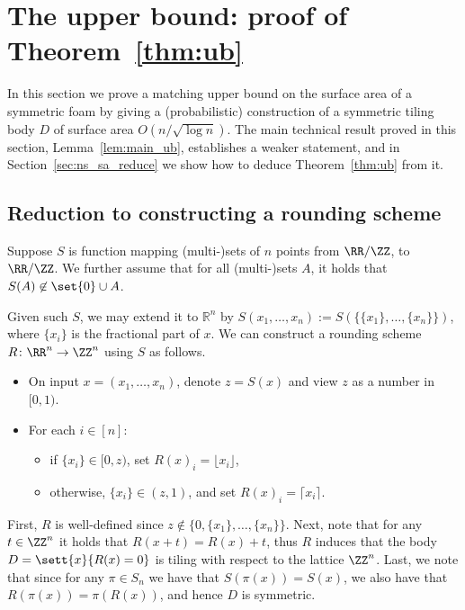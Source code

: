 \setcounter{thm}{21}\setcounter{section}{3}\section{The upper bound: proof of Theorem~\ref{thm:ub}}\label{sec:ub}
In this section we prove a matching upper bound on the surface area of a symmetric foam by giving a
(probabilistic) construction of a symmetric tiling body $D$ of surface area $O(n/\sqrt{\log n})$.
The main technical result proved in this section, Lemma~\ref{lem:main_ub}, establishes a weaker statement,
and in Section~\ref{sec:ns_sa_reduce} we show how to deduce Theorem~\ref{thm:ub} from it.

\subsection{Reduction to constructing a rounding scheme}\label{sec:mapping_to_tiling}
Suppose $S$ is function mapping (multi-)sets of $n$ points from $\RR/\ZZ$, to $\RR/\ZZ$.
We further assume that for all (multi-)sets $A$, it holds that $S(A)\not\in\set{0}\cup A$.


Given such $S$, we may extend it to $\mathbb{R}^n$ by
$S(x_1,\ldots,x_n):=S(\{\{x_1\},\ldots,\{x_n\}\})$, where $\{x_i\}$ is the fractional part of $x$.
We can construct a rounding scheme
$R\colon \RR^n\to \ZZ^n$ using $S$ as follows.
\begin{itemize}
	\item
	On input $x=(x_1,\ldots,x_n)$, denote $z=S(x)$ and view
	$z$ as a number in $[0,1)$.
	\item For each $i\in [n]$:
\begin{itemize}
    \item
	if $\{x_i\}\in [0,z)$, set $R(x)_i = \lfloor x_i \rfloor$,
    \item otherwise, $\{x_i\}\in (z,1)$, and set $R(x)_i = \lceil x_i \rceil$.
\end{itemize}
\end{itemize}
First, $R$ is well-defined since $z\notin \{0,\{x_1\},\ldots,\{x_n\}\}$.
Next, note that for any $t\in\ZZ^n$ it holds that $R(x+t)=R(x)+t$, thus $R$ induces
that the body $D = \sett{x}{R(x) = 0}$ is tiling with respect to the lattice $\ZZ^n$.
Last, we note that since for any $\pi\in S_n$ we have that $S(\pi(x))=S(x)$, we also have
that $R(\pi(x))=\pi(R(x))$, and hence $D$ is symmetric.

